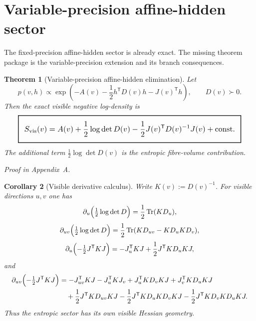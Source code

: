 \documentclass[11pt,a4paper]{article}
\numberwithin{equation}{section}
\DeclareMathOperator{\Tr}{Tr}
\newcommand{\geomboxed}[1]{%
  \setlength{\fboxsep}{8pt}%
  \setlength{\fboxrule}{0.9pt}%
  \fbox{\scalebox{1.12}{$\displaystyle #1$}}%
}
\theoremstyle{thmcompact}
\newtheorem{theorem}{Theorem}[section]
\newtheorem{corollary}[theorem]{Corollary}
\theoremstyle{remark}
\newcommand{\proofappendix}{\par{\hfill\scriptsize\emph{Proof in Appendix~A.}}\par}
\begin{document}
\section{Variable-precision affine-hidden sector}

The fixed-precision affine-hidden sector is already exact. The missing theorem package is the variable-precision extension and its branch consequences.

\begin{theorem}[Variable-precision affine-hidden elimination]
\label{thm:variable-precision-elimination}
Let
\begin{equation}
p(v,h)\propto
\exp\!\left(
-A(v)-\frac12 h^{\mathsf T}D(v)h-J(v)^{\mathsf T}h
\right),
\qquad D(v)\succ 0.
\end{equation}
Then the exact visible negative log-density is
\begin{equation}
\geomboxed{S_{\mathrm{vis}}(v)
=
A(v)
+\frac12\log\det D(v)
-\frac12J(v)^{\mathsf T}D(v)^{-1}J(v)
+\mathrm{const}.}
\label{eq:variable-precision-visible}
\end{equation}
The additional term $\frac12\log\det D(v)$ is the entropic fibre-volume contribution.
\end{theorem}

\proofappendix

\begin{corollary}[Visible derivative calculus]
\label{cor:variable-precision-derivatives}
Write $K(v):=D(v)^{-1}$. For visible directions $u,v$ one has
\begin{equation}
\partial_u\Bigl(\tfrac12\log\det D\Bigr)=\frac12\Tr(KD_u),
\end{equation}
\begin{equation}
\partial_{uv}\Bigl(\tfrac12\log\det D\Bigr)=\frac12\Tr(KD_{uv}-KD_uKD_v),
\end{equation}
\begin{equation}
\partial_u\Bigl(-\tfrac12J^{\mathsf T}KJ\Bigr)
=-J_u^{\mathsf T}KJ+\frac12J^{\mathsf T}KD_uKJ,
\end{equation}
and
\begin{align}
\partial_{uv}\Bigl(-\tfrac12J^{\mathsf T}KJ\Bigr)
&=-J_{uv}^{\mathsf T}KJ-J_u^{\mathsf T}KJ_v+J_u^{\mathsf T}KD_vKJ+J_v^{\mathsf T}KD_uKJ \notag\\
&\quad +\frac12J^{\mathsf T}KD_{uv}KJ-\frac12J^{\mathsf T}KD_uKD_vKJ-\frac12J^{\mathsf T}KD_vKD_uKJ.
\end{align}
Thus the entropic sector has its own visible Hessian geometry.
\end{corollary}
\end{document}
